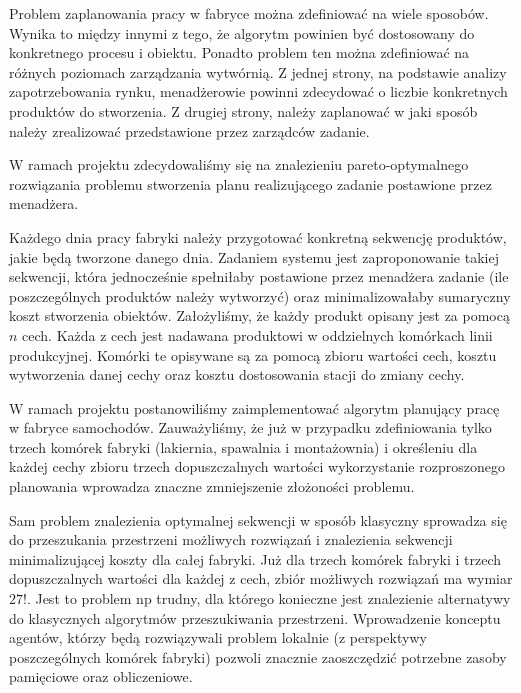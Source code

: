 
Problem zaplanowania pracy w fabryce można zdefiniować na wiele sposobów. Wynika to między innymi z tego, że algorytm powinien być dostosowany do konkretnego procesu i obiektu. Ponadto problem ten można zdefiniować na różnych poziomach zarządzania wytwórnią. Z jednej strony, na podstawie analizy zapotrzebowania rynku, menadżerowie powinni zdecydować o liczbie konkretnych produktów do stworzenia. Z drugiej strony, należy zaplanować w jaki sposób należy zrealizować przedstawione przez zarządców zadanie.

W ramach projektu zdecydowaliśmy się na znalezieniu pareto-optymalnego rozwiązania problemu stworzenia planu realizującego zadanie postawione przez menadżera. 

Każdego dnia pracy fabryki należy przygotować konkretną sekwencję produktów, jakie będą tworzone danego dnia. Zadaniem systemu jest zaproponowanie takiej sekwencji, która jednocześnie spełniłaby postawione przez menadżera zadanie (ile poszczególnych produktów należy wytworzyć) oraz minimalizowałaby sumaryczny koszt stworzenia obiektów. Założyliśmy, że każdy produkt opisany jest za pomocą $n$ cech. Każda z cech jest nadawana produktowi w oddzielnych komórkach linii produkcyjnej. Komórki te opisywane są za pomocą zbioru wartości cech, kosztu wytworzenia danej cechy oraz kosztu dostosowania stacji do zmiany cechy.

W ramach projektu postanowiliśmy zaimplementować algorytm planujący pracę w fabryce samochodów. Zauważyliśmy, że już w przypadku zdefiniowania tylko trzech komórek fabryki (lakiernia, spawalnia i montażownia) i określeniu dla każdej cechy zbioru trzech dopuszczalnych wartości wykorzystanie rozproszonego planowania wprowadza znaczne zmniejszenie złożoności problemu. 

Sam problem znalezienia optymalnej sekwencji w sposób klasyczny sprowadza się do przeszukania przestrzeni możliwych rozwiązań i znalezienia sekwencji minimalizującej koszty dla całej fabryki. Już dla trzech komórek fabryki i trzech dopuszczalnych wartości dla każdej z cech, zbiór możliwych rozwiązań ma wymiar $27!$. Jest to problem np trudny, dla którego konieczne jest znalezienie alternatywy do klasycznych algorytmów przeszukiwania przestrzeni. Wprowadzenie konceptu agentów, którzy będą rozwiązywali problem lokalnie (z perspektywy poszczególnych komórek fabryki) pozwoli znacznie zaoszczędzić potrzebne zasoby pamięciowe oraz obliczeniowe.